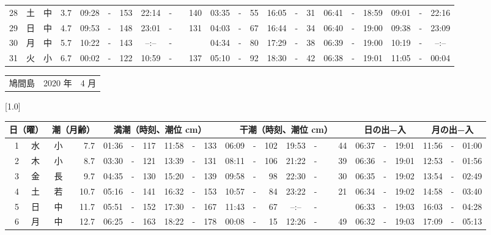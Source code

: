 \documentclass[12pt,a4j]{jsarticle}
\begin{document}
\begin{table}[htbp]
\begin{center}
{\begin{tabular}{|rc|cr|ccrccr|ccrccr|ccc|ccc|}
28 & 土 & 中 &  3.7 &  09:28 &-& 153 &  22:14 &-& 140 &  03:35 &-&  55 &  16:05 &-&  31 & 06:41 & -& 18:59 & 09:01 & -& 22:16 \\
29 & 日 & 中 &  4.7 &  09:53 &-& 148 &  23:01 &-& 131 &  04:03 &-&  67 &  16:44 &-&  34 & 06:40 & -& 19:00 & 09:38 & -& 23:09 \\
30 & 月 & 中 &  5.7 &  10:22 &-& 143 &  --:-- &-&~~~~~ &  04:34 &-&  80 &  17:29 &-&  38 & 06:39 & -& 19:00 & 10:19 & -& --:-- \\
31 & 火 & 小 &  6.7 &  00:02 &-& 122 &  10:59 &-& 137 &  05:10 &-&  92 &  18:30 &-&  42 & 06:38 & -& 19:01 & 11:05 & -& 00:04 \\
   \hline
   \end{tabular}}
   \end{center}
\end{table}
\newpage
 \begin{table}[htbp]
 \begin{center}
 \begin{tabular}{lcc}
 \LARGE{鳩間島}  & \large{2020 年} & \large{ 4 月} \\
 \end{tabular}
 \end{center}
 \begin{center}
    \scalebox{0.7}[1.0]{
    \begin{tabular}{|rc|cr|ccrccr|ccrccr|ccc|ccc|}
    \hline
    \multicolumn{2}{|c|}{日（曜）} & \multicolumn{2}{c|}{潮（月齢）} & \multicolumn{6}{c|}{満潮（時刻、潮位 cm）} & \multicolumn{6}{c|}{干潮（時刻、潮位 cm）} & \multicolumn{3}{c|}{日の出−入} &  \multicolumn{3}{c|}{月の出−入}\\
 \hline
 1 & 水 & 小 &  7.7 &  01:36 &-& 117 &  11:58 &-& 133 &  06:09 &-& 102 &  19:53 &-&  44 & 06:37 & -& 19:01 & 11:56 & -& 01:00 \\
 2 & 木 & 小 &  8.7 &  03:30 &-& 121 &  13:39 &-& 131 &  08:11 &-& 106 &  21:22 &-&  39 & 06:36 & -& 19:01 & 12:53 & -& 01:56 \\
 3 & 金 & 長 &  9.7 &  04:35 &-& 130 &  15:20 &-& 139 &  09:58 &-&  98 &  22:30 &-&  30 & 06:35 & -& 19:02 & 13:54 & -& 02:49 \\
 4 & 土 & 若 & 10.7 &  05:16 &-& 141 &  16:32 &-& 153 &  10:57 &-&  84 &  23:22 &-&  21 & 06:34 & -& 19:02 & 14:58 & -& 03:40 \\
 5 & 日 & 中 & 11.7 &  05:51 &-& 152 &  17:30 &-& 167 &  11:43 &-&  67 &  --:-- &-&~~~~~ & 06:33 & -& 19:03 & 16:03 & -& 04:28 \\
 6 & 月 & 中 & 12.7 &  06:25 &-& 163 &  18:22 &-& 178 &  00:08 &-&  15 &  12:26 &-&  49 & 06:32 & -& 19:03 & 17:09 & -& 05:13 \\

\end{tabular}}
\end{center}
\end{table}
\end{document}
